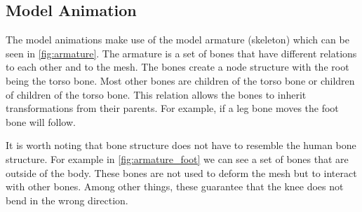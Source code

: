 \subsection{Model Animation} \label{sec:theory_theory_models_animation}
The model animations make use of the model armature (skeleton) which can be seen in \autoref{fig:armature}.
The armature is a set of bones that have different relations to each other and to the mesh.
The bones create a node structure with the root being the torso bone.
Most other bones are children of the torso bone or children of children of the torso bone.
This relation allows the bones to inherit transformations from their parents.
For example, if a leg bone moves the foot bone will follow.

It is worth noting that bone structure does not have to resemble the human bone structure.
For example in \autoref{fig:armature_foot} we can see a set of bones that are outside of the body.
These bones are not used to deform the mesh but to interact with other bones.
Among other things, these guarantee that the knee does not bend in the wrong direction.


